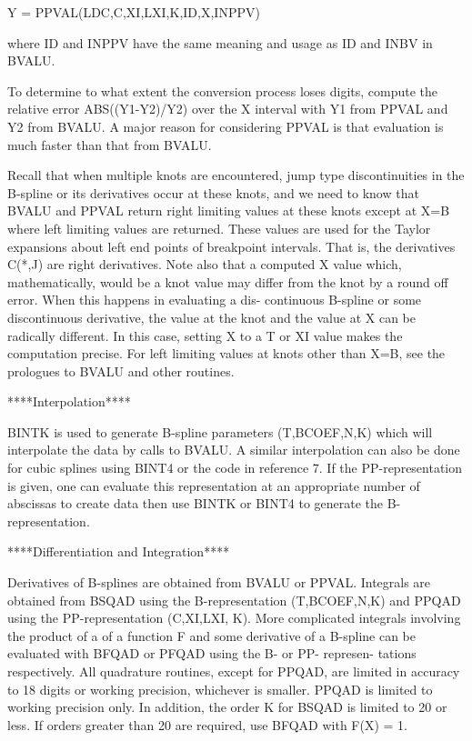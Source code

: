 \documentclass[11pt,twoside,nolof]{starlink}
\begin{document}
\begin{terminalv}
                Y = PPVAL(LDC,C,XI,LXI,K,ID,X,INPPV)

     where ID and INPPV have the same meaning and usage as ID and
     INBV in BVALU.

     To determine to what extent the conversion process loses
     digits, compute the relative error ABS((Y1-Y2)/Y2) over
     the X interval with Y1 from PPVAL and Y2 from BVALU.  A
     major reason for considering PPVAL is that evaluation is
     much faster than that from BVALU.

     Recall that when multiple knots are encountered, jump type
     discontinuities in the B-spline or its derivatives occur
     at these knots, and we need to know that BVALU and PPVAL
     return right limiting values at these knots except at
     X=B where left limiting values are returned.  These values
     are used for the Taylor expansions about left end points of
     breakpoint intervals.  That is, the derivatives C(*,J) are
     right derivatives.  Note also that a computed X value which,
     mathematically, would be a knot value may differ from the knot
     by a round off error.  When this happens in evaluating a dis-
     continuous B-spline or some discontinuous derivative, the
     value at the knot and the value at X can be radically
     different.  In this case, setting X to a T or XI value makes
     the computation precise.  For left limiting values at knots
     other than X=B, see the prologues to BVALU and other
     routines.

                     ****Interpolation****

     BINTK is used to generate B-spline parameters (T,BCOEF,N,K)
     which will interpolate the data by calls to BVALU.  A similar
     interpolation can also be done for cubic splines using BINT4
     or the code in reference 7.  If the PP-representation is given,
     one can evaluate this representation at an appropriate number of
     abscissas to create data then use BINTK or BINT4 to generate
     the B-representation.

               ****Differentiation and Integration****

     Derivatives of B-splines are obtained from BVALU or PPVAL.
     Integrals are obtained from BSQAD using the B-representation
     (T,BCOEF,N,K) and PPQAD using the PP-representation (C,XI,LXI,
     K).  More complicated integrals involving the product of a
     of a function F and some derivative of a B-spline can be
     evaluated with BFQAD or PFQAD using the B- or PP- represen-
     tations respectively.  All quadrature routines, except for PPQAD,
     are limited in accuracy to 18 digits or working precision,
     whichever is smaller.  PPQAD is limited to working precision
     only.  In addition, the order K for BSQAD is limited to 20 or
     less.  If orders greater than 20 are required, use BFQAD with
     F(X) = 1.


\end{terminalv}
\end{document}

